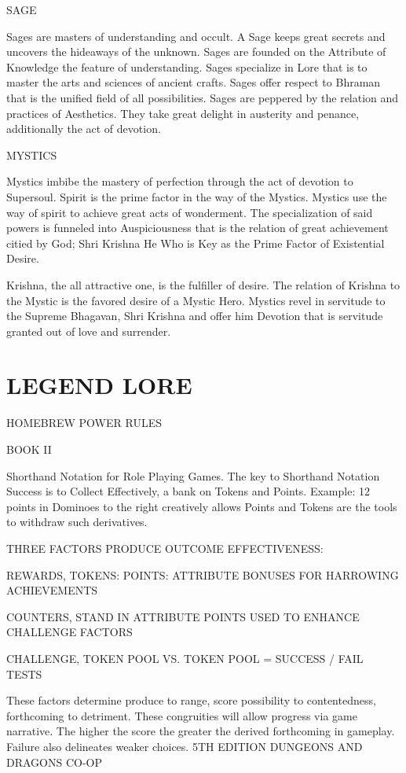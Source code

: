 \documentclass{article}
\begin{document}
SAGE

	Sages are masters of understanding and occult. A Sage keeps great secrets and uncovers the
hideaways of the unknown. Sages are founded on the Attribute of Knowledge the feature of
understanding. Sages specialize in Lore that is to master the arts and sciences of ancient crafts.
Sages offer respect to Bhraman that is the unified field of all possibilities. Sages are peppered by
the relation and practices of Aesthetics. They take great delight in austerity and penance,
additionally the act of devotion.

MYSTICS

	Mystics imbibe the mastery of perfection through the act of devotion to Supersoul. Spirit is the
prime factor in the way of the Mystics. Mystics use the way of spirit to achieve great acts of
wonderment. The specialization of said powers is funneled into
Auspiciousness that is the relation of great achievement citied by God; Shri Krishna He Who is
Key as the Prime Factor of Existential Desire.

	Krishna, the all attractive one, is the fulfiller of desire. The relation of Krishna to the Mystic is
the favored desire of a Mystic Hero. Mystics revel in servitude to the Supreme Bhagavan, Shri
Krishna and offer him Devotion that is servitude granted out of love and surrender.

\section{LEGEND LORE}

HOMEBREW POWER RULES

BOOK II

Shorthand Notation for Role Playing Games. The key to Shorthand Notation Success is to
Collect Effectively, a bank on Tokens and Points.
Example: 12 points in Dominoes to the right creatively allows Points and Tokens are the tools to
withdraw such derivatives.

THREE FACTORS PRODUCE OUTCOME EFFECTIVENESS:

REWARDS, TOKENS: POINTS: ATTRIBUTE BONUSES FOR HARROWING
ACHIEVEMENTS

COUNTERS, STAND IN ATTRIBUTE POINTS USED TO ENHANCE
CHALLENGE FACTORS

CHALLENGE, TOKEN POOL VS. TOKEN POOL = SUCCESS / FAIL TESTS

These factors determine produce to range, score possibility to contentedness, forthcoming to
detriment. These congruities will allow progress via game narrative. The higher the score the
greater the derived forthcoming in gameplay. Failure also delineates weaker choices.
5TH EDITION DUNGEONS AND DRAGONS CO-OP
\end{document}
